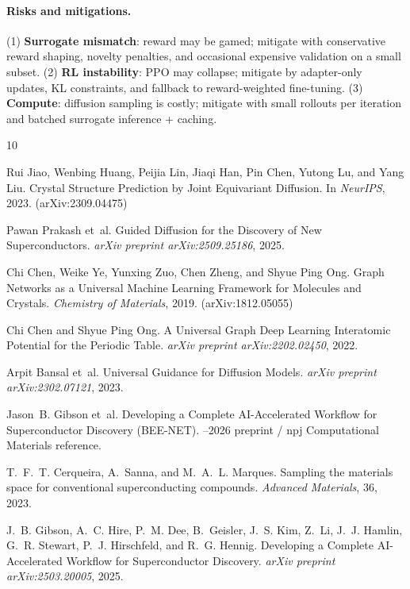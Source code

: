 \documentclass{article}
\begin{document}
\paragraph{Risks and mitigations.}
(1) \textbf{Surrogate mismatch}: reward may be gamed; mitigate with conservative reward shaping, novelty penalties, and occasional expensive validation on a small subset.
(2) \textbf{RL instability}: PPO may collapse; mitigate by adapter-only updates, KL constraints, and fallback to reward-weighted fine-tuning.
(3) \textbf{Compute}: diffusion sampling is costly; mitigate with small rollouts per iteration and batched surrogate inference + caching.

\begin{thebibliography}{10}

Rui Jiao, Wenbing Huang, Peijia Lin, Jiaqi Han, Pin Chen, Yutong Lu, and Yang Liu.
\newblock Crystal Structure Prediction by Joint Equivariant Diffusion.
\newblock In \emph{NeurIPS}, 2023. (arXiv:2309.04475)

Pawan Prakash et~al.
\newblock Guided Diffusion for the Discovery of New Superconductors.
\newblock \emph{arXiv preprint arXiv:2509.25186}, 2025.

Chi Chen, Weike Ye, Yunxing Zuo, Chen Zheng, and Shyue Ping Ong.
\newblock Graph Networks as a Universal Machine Learning Framework for Molecules and Crystals.
\newblock \emph{Chemistry of Materials}, 2019. (arXiv:1812.05055)

Chi Chen and Shyue Ping Ong.
\newblock A Universal Graph Deep Learning Interatomic Potential for the Periodic Table.
\newblock \emph{arXiv preprint arXiv:2202.02450}, 2022.

Arpit Bansal et~al.
\newblock Universal Guidance for Diffusion Models.
\newblock \emph{arXiv preprint arXiv:2302.07121}, 2023.

Jason~B. Gibson et~al.
\newblock Developing a Complete AI-Accelerated Workflow for Superconductor Discovery (BEE-NET).
--2026 preprint / npj Computational Materials reference.

T.~F.~T. Cerqueira, A.~Sanna, and M.~A.~L. Marques.
\newblock Sampling the materials space for conventional superconducting compounds.
\newblock \emph{Advanced Materials}, 36, 2023.

J.~B. Gibson, A.~C. Hire, P.~M. Dee, B.~Geisler, J.~S. Kim, Z.~Li, J.~J. Hamlin, G.~R. Stewart, P.~J. Hirschfeld, and R.~G. Hennig.
\newblock Developing a Complete AI-Accelerated Workflow for Superconductor Discovery.
\newblock \emph{arXiv preprint arXiv:2503.20005}, 2025.

\end{thebibliography}
\end{document}
